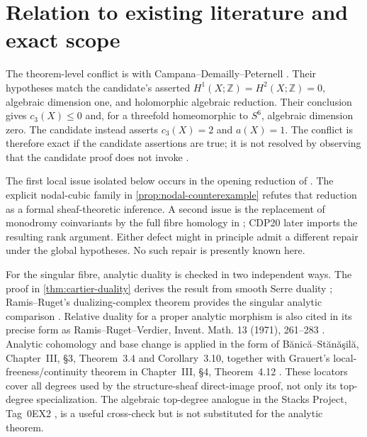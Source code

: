\section{Relation to existing literature and exact scope}

The theorem-level conflict is with Campana--Demailly--Peternell
\cite[Theorem~2.2 and Corollary~2.3, p.~680]{CDP2020}.  Their hypotheses match
the candidate's asserted $H^1(X;\mathbb Z)=H^2(X;\mathbb Z)=0$, algebraic
dimension one, and holomorphic algebraic reduction.  Their conclusion gives
$c_3(X)\leq0$ and, for a threefold homeomorphic to $S^6$, algebraic dimension
zero.  The candidate instead asserts $c_3(X)=2$ and $a(X)=1$.  The conflict is
therefore exact if the candidate assertions are true; it is not resolved by
observing that the candidate proof does not invoke \cite{CDP2020}.

The first local issue isolated below occurs in the opening reduction of
\cite[\S7, p.~692]{CDP2020}.  The explicit nodal-cubic family in
\cref{prop:nodal-counterexample} refutes that reduction as a formal
sheaf-theoretic inference.  A second issue is the replacement of monodromy
coinvariants by the full fibre homology in
\cite[Lemma~3.2, pp.~84--85]{CDP1998}; CDP20 later imports the resulting
rank argument.  Either defect might in principle admit a different repair
under the global hypotheses.  No such repair is presently known here.

For the singular fibre, analytic duality is checked in two independent ways.
The proof in \cref{thm:cartier-duality} derives the result from smooth Serre
duality \cite[Theorem~9.37]{Lee2024}; Ramis--Ruget's dualizing-complex theorem
provides the singular analytic comparison
\cite[Theorems~1--2, pp.~81--84, and Proposition~2, p.~91]{RamisRuget1970}.
Relative duality for a proper analytic morphism is also cited in its precise
form as Ramis--Ruget--Verdier, Invent. Math. 13 (1971), 261--283
\cite{RamisRugetVerdier1971}.  Analytic cohomology and base change is
applied in the form of B\u{a}nic\u{a}--St\u{a}n\u{a}\c{s}il\u{a},
Chapter~III, \S3, Theorem~3.4 and Corollary~3.10, together with Grauert's
local-freeness/continuity theorem in Chapter~III, \S4, Theorem~4.12
\cite{BanicaStanasila1976}.  These locators cover all degrees used by the
structure-sheaf direct-image proof, not only its top-degree specialization.
The algebraic top-degree analogue in the Stacks Project, Tag~0EX2
\cite{StacksProject}, is a useful cross-check but is not substituted for the
analytic theorem.

